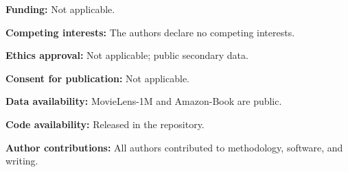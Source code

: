\documentclass[pdflatex,sn-mathphys-num]{sn-jnl}%
\theoremstyle{thmstyleone}%
\theoremstyle{thmstyletwo}%
\theoremstyle{thmstylethree}%
\begin{document}
\begin{declarations}
\item \textbf{Funding:} Not applicable.
\item \textbf{Competing interests:} The authors declare no competing interests.
\item \textbf{Ethics approval:} Not applicable; public secondary data.
\item \textbf{Consent for publication:} Not applicable.
\item \textbf{Data availability:} MovieLens-1M and Amazon-Book are public.
\item \textbf{Code availability:} Released in the repository.
\item \textbf{Author contributions:} All authors contributed to methodology, software, and writing.
\end{declarations}

%
\end{document}
